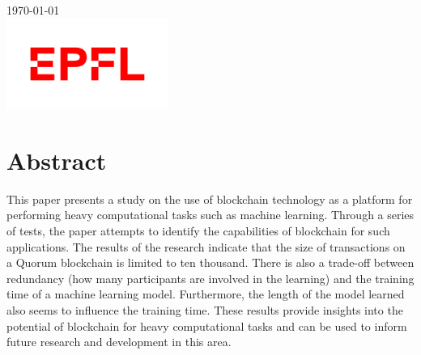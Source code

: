 \documentclass{article}
\begin{document}
\begin{titlepage}

    {\large \today}\\[2cm] %


    \includegraphics[width=200px, keepaspectratio]{epfl}\\[1cm] %


    \vfill %

\end{titlepage}

\newpage
{}

\tableofcontents

\newpage
\section{Abstract}
This paper presents a study on the use of blockchain technology as a platform for performing heavy computational tasks
such as machine learning. Through a series of tests, the paper attempts to identify the capabilities of blockchain for
such applications. The results of the research indicate that the size of transactions on a Quorum blockchain is limited to ten thousand.
There is also a trade-off between redundancy (how many participants are involved in the learning) and the training time of a machine learning model.
Furthermore, the length of the model learned also seems to influence the training time. These results provide insights into the potential of blockchain for heavy
computational tasks and can be used to inform future research and development in this area.
\newpage
\end{document}
